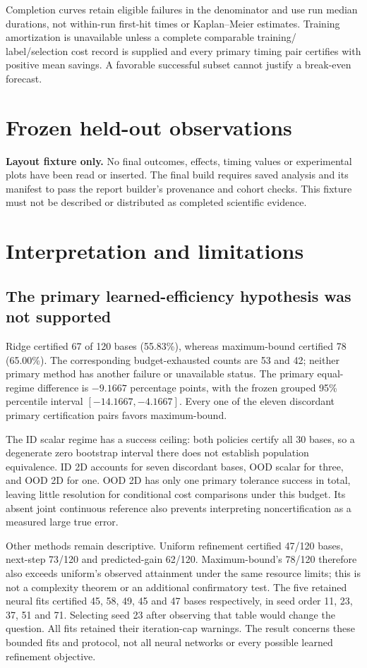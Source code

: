 \documentclass[10pt,a4paper]{article}
\begin{document}
Completion curves retain eligible failures in the denominator and use run
median durations, not within-run first-hit times or Kaplan--Meier estimates.
Training amortization is unavailable unless a complete comparable training/
label/selection cost record is supplied and every primary timing pair certifies
with positive mean savings. A favorable successful subset cannot justify a
break-even forecast.

\clearpage
\section{Frozen held-out observations}
\ifdefined\LayoutFixture
\textbf{Layout fixture only.} No final outcomes, effects, timing values or
experimental plots have been read or inserted. The final build requires
saved analysis and its manifest to pass the report builder's provenance and
cohort checks. This fixture must not be described or distributed as completed
scientific evidence.
\else

\fi

\section{Interpretation and limitations}
\subsection{The primary learned-efficiency hypothesis was not supported}
Ridge certified 67 of 120 bases (55.83\%), whereas maximum-bound certified
78 (65.00\%). The corresponding budget-exhausted counts are 53 and 42;
neither primary method has another failure or unavailable status. The primary
equal-regime difference is $-9.1667$ percentage points, with the frozen grouped
95\% percentile interval $[-14.1667,-4.1667]$. Every one of the eleven
discordant primary certification pairs favors maximum-bound.

The ID scalar regime has a success ceiling: both policies certify all 30
bases, so a degenerate zero bootstrap interval there does not establish
population equivalence. ID 2D accounts for seven discordant bases, OOD scalar
for three, and OOD 2D for one. OOD 2D has only one primary tolerance success in
total, leaving little resolution for conditional cost comparisons under this
budget. Its absent joint continuous reference also prevents interpreting
noncertification as a measured large true error.

Other methods remain descriptive. Uniform refinement certified 47/120 bases,
next-step 73/120 and predicted-gain 62/120. Maximum-bound's 78/120 therefore
also exceeds uniform's observed attainment under the same resource limits;
this is not a complexity theorem or an additional confirmatory test. The five
retained neural fits certified 45, 58, 49, 45 and 47 bases respectively, in
seed order 11, 23, 37, 51 and 71. Selecting seed 23 after observing that table
would change the question. All fits retained their iteration-cap warnings.
The result concerns these bounded fits and protocol, not all neural networks
or every possible learned refinement objective.
\end{document}
